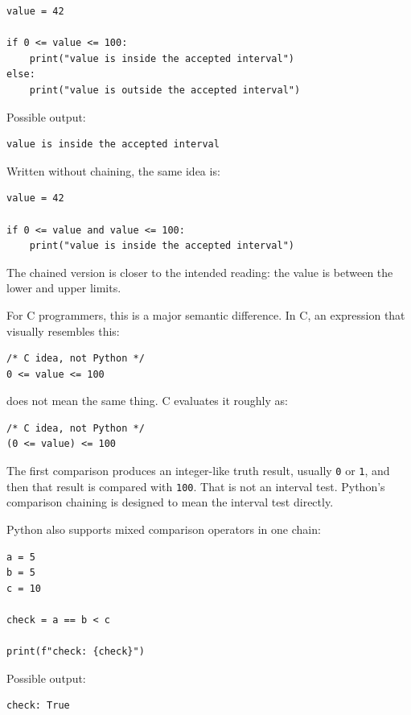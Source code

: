 \begin{verbatim}
value = 42

if 0 <= value <= 100:
    print("value is inside the accepted interval")
else:
    print("value is outside the accepted interval")
\end{verbatim}

Possible output:

\begin{verbatim}
value is inside the accepted interval
\end{verbatim}

Written without chaining, the same idea is:

\begin{verbatim}
value = 42

if 0 <= value and value <= 100:
    print("value is inside the accepted interval")
\end{verbatim}

The chained version is closer to the intended reading: the value is between the lower and upper limits.

For C programmers, this is a major semantic difference. In C, an expression that visually resembles this:

\begin{verbatim}
/* C idea, not Python */
0 <= value <= 100
\end{verbatim}

does not mean the same thing. C evaluates it roughly as:

\begin{verbatim}
/* C idea, not Python */
(0 <= value) <= 100
\end{verbatim}

The first comparison produces an integer-like truth result, usually \texttt{0} or \texttt{1}, and then that result is compared with \texttt{100}. That is not an interval test. Python's comparison chaining is designed to mean the interval test directly.

Python also supports mixed comparison operators in one chain:

\begin{verbatim}
a = 5
b = 5
c = 10

check = a == b < c

print(f"check: {check}")
\end{verbatim}

Possible output:

\begin{verbatim}
check: True
\end{verbatim}

